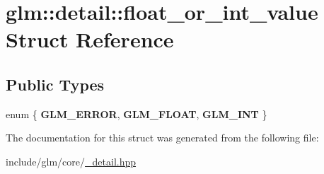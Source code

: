 \hypertarget{structglm_1_1detail_1_1float__or__int__value}{\section{glm\-:\-:detail\-:\-:float\-\_\-or\-\_\-int\-\_\-value \-Struct \-Reference}
\label{structglm_1_1detail_1_1float__or__int__value}
}
\subsection*{\-Public \-Types}
\begin{DoxyCompactItemize}
\item 
enum \{ {\bfseries \-G\-L\-M\-\_\-\-E\-R\-R\-O\-R}, 
{\bfseries \-G\-L\-M\-\_\-\-F\-L\-O\-A\-T}, 
{\bfseries \-G\-L\-M\-\_\-\-I\-N\-T}
 \}
\end{DoxyCompactItemize}


\-The documentation for this struct was generated from the following file\-:\begin{DoxyCompactItemize}
\item 
include/glm/core/\hyperlink{__detail_8hpp}{\-\_\-detail.\-hpp}\end{DoxyCompactItemize}

